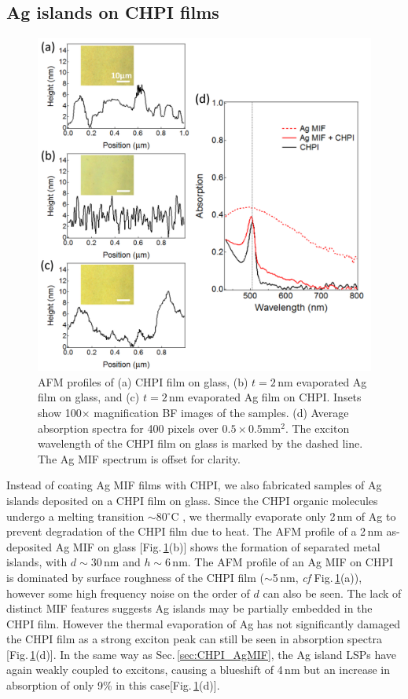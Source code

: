 \subsection{Ag islands on CHPI films}
\label{sec:AgonCHPI}
\begin{figure}[h!] 
\centering    
\includegraphics[width=\textwidth]{Fig8}
\caption{AFM profiles of (a) CHPI film on glass, (b) $t=2$\,nm evaporated Ag film on glass, and (c) $t=2$\,nm evaporated Ag film on CHPI. Insets show 100$\times$ magnification BF images of the samples. (d) Average absorption spectra for 400 pixels over $0.5\times0.5$mm$^2$. The exciton wavelength of the CHPI film on glass is marked by the dashed line. The Ag MIF spectrum is offset for clarity.}
\label{6Fig8}
\end{figure}
Instead of coating Ag MIF films with CHPI, we also fabricated samples of Ag islands deposited on a CHPI film on glass. Since the CHPI organic molecules undergo a melting transition $\sim$80$^{\circ}$C \cite{Barman2003}, we thermally evaporate only 2\,nm of Ag to prevent degradation of the CHPI film due to heat. The AFM profile of a 2\,nm as-deposited Ag MIF on glass [Fig.\,\ref{6Fig8}(b)] shows the formation of separated metal islands, with $d\sim30$\,nm and $h\sim6$\,nm. The AFM profile of an Ag MIF on CHPI is dominated by surface roughness of the CHPI film ($\sim$5\,nm, \textit{cf} Fig.\,\ref{6Fig8}(a)), however some high frequency noise on the order of $d$ can also be seen. The lack of distinct MIF features suggests Ag islands may be partially embedded in the CHPI film. However the thermal evaporation of Ag has not significantly damaged the CHPI film as a strong exciton peak can still be seen in absorption spectra [Fig.\,\ref{6Fig8}(d)]. In the same way as Sec.\,\ref{sec:CHPI_AgMIF}, the Ag island LSPs have again weakly coupled to excitons, causing a blueshift of 4\,nm but an increase in absorption of only 9\% in this case[Fig.\,\ref{6Fig8}(d)].

